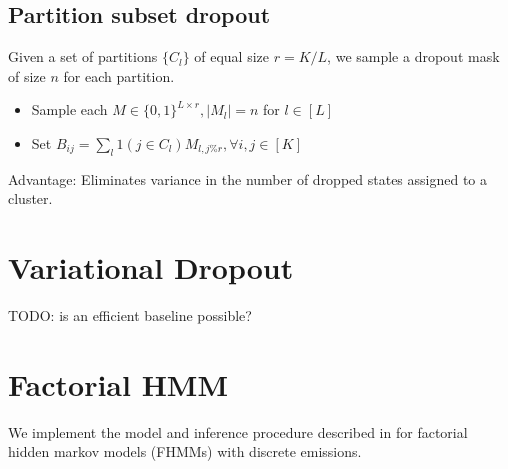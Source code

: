 \documentclass[12pt]{article}
\begin{document}
\subsection*{Partition subset dropout}
Given a set of partitions $\{C_l\}$ of equal size $r = K/L$,
we sample a dropout mask of size $n$ for each partition.
\begin{itemize}
\item Sample each $M \in \{0,1\}^{L \times r}, |M_l| = n$ for $l \in [L]$
\item Set $B_{ij} = \sum_l 1(j \in C_l) M_{l,j \% r}, \forall i,j \in [K]$
\end{itemize}

Advantage: Eliminates variance in the number of dropped states assigned
to a cluster.

\section{Variational Dropout}
TODO: is an efficient baseline possible?

\section{Factorial HMM}
We implement the model and inference procedure described in
\citet{nepal2014fhmm,ghahramani1997fhmm} for factorial hidden markov models (FHMMs)
with discrete emissions.



\end{document}
